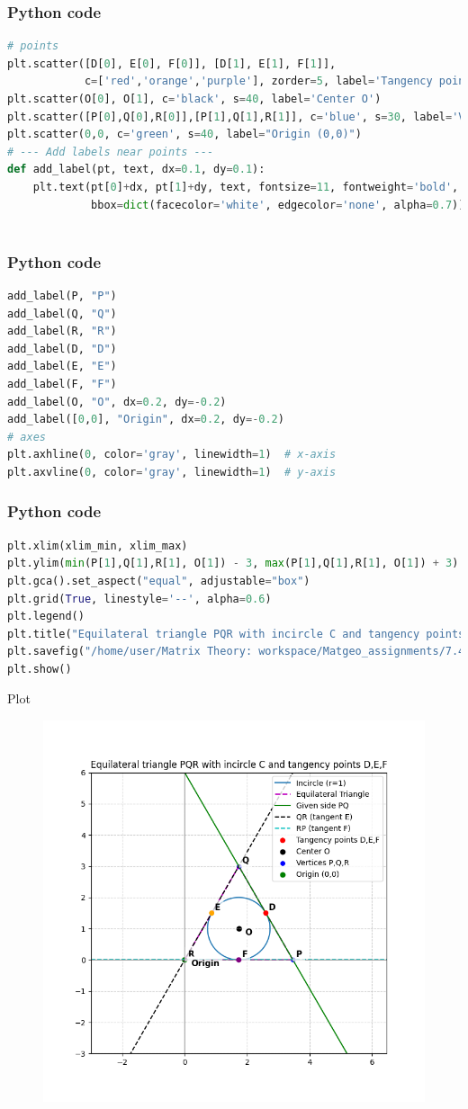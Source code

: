 \documentclass{beamer}
\begin{document}
\begin{frame}[fragile]
    \frametitle{Python code}
    \begin{lstlisting}[language=Python]
# points
plt.scatter([D[0], E[0], F[0]], [D[1], E[1], F[1]], 
            c=['red','orange','purple'], zorder=5, label='Tangency points D,E,F')
plt.scatter(O[0], O[1], c='black', s=40, label='Center O')
plt.scatter([P[0],Q[0],R[0]],[P[1],Q[1],R[1]], c='blue', s=30, label='Vertices P,Q,R')
plt.scatter(0,0, c='green', s=40, label="Origin (0,0)")
# --- Add labels near points ---
def add_label(pt, text, dx=0.1, dy=0.1):
    plt.text(pt[0]+dx, pt[1]+dy, text, fontsize=11, fontweight='bold',
             bbox=dict(facecolor='white', edgecolor='none', alpha=0.7))



    \end{lstlisting}   
\end{frame}

\begin{frame}[fragile]
    \frametitle{Python code}
    \begin{lstlisting}[language=Python]
add_label(P, "P")
add_label(Q, "Q")
add_label(R, "R")
add_label(D, "D")
add_label(E, "E")
add_label(F, "F")
add_label(O, "O", dx=0.2, dy=-0.2)
add_label([0,0], "Origin", dx=0.2, dy=-0.2)
# axes
plt.axhline(0, color='gray', linewidth=1)  # x-axis
plt.axvline(0, color='gray', linewidth=1)  # y-axis
    \end{lstlisting}   
\end{frame}

\begin{frame}[fragile]
    \frametitle{Python code}
    \begin{lstlisting}[language=Python]
plt.xlim(xlim_min, xlim_max)
plt.ylim(min(P[1],Q[1],R[1], O[1]) - 3, max(P[1],Q[1],R[1], O[1]) + 3)
plt.gca().set_aspect("equal", adjustable="box")
plt.grid(True, linestyle='--', alpha=0.6)
plt.legend()
plt.title("Equilateral triangle PQR with incircle C and tangency points D,E,F")
plt.savefig("/home/user/Matrix Theory: workspace/Matgeo_assignments/7.4.33/figs/Figure_1.png")
plt.show()
    \end{lstlisting}   
\end{frame}

\begin{frame}{Plot}
    \begin{figure}[H]
    \centering
    \includegraphics[width=0.6\columnwidth]{figs/Figure_1.png}
    \label{fig:1}
\end{figure}
\end{frame}
\end{document}
